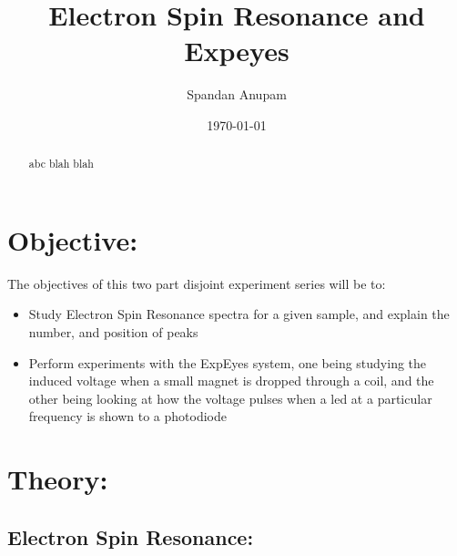\documentclass{article}
\begin{document}
\title{Electron Spin Resonance and Expeyes}

\author{Spandan Anupam}

\date{\today}
\maketitle

\begin{abstract}
abc blah blah

\end{abstract}
\section{Objective:}
The objectives of this two part disjoint experiment series will be to:

\begin{itemize}
\tightlist
\item
  Study Electron Spin Resonance spectra for a given sample, and explain the number, and position of peaks
\item
  Perform experiments with the ExpEyes system, one being studying the induced voltage when a small magnet is dropped through a coil, and the other being looking at how the voltage pulses when a led at a particular frequency is shown to a photodiode
\end{itemize}

\section{Theory:}
\subsection{Electron Spin Resonance:}
\end{document}
